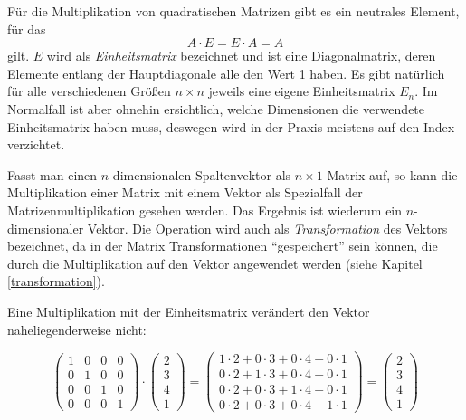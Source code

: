 Für die Multiplikation von quadratischen Matrizen gibt es ein neutrales Element, für das
\begin{equation}
 A \cdot E = E \cdot A = A
\end{equation}
gilt. $E$ wird als \emph{Einheitsmatrix} bezeichnet und ist eine Diagonalmatrix, deren Elemente entlang der Hauptdiagonale alle den Wert 1 haben. Es gibt natürlich für alle verschiedenen Größen $n \times n$ jeweils eine eigene Einheitsmatrix $E_n$. Im Normalfall ist aber ohnehin ersichtlich, welche Dimensionen die verwendete Einheitsmatrix haben muss, deswegen wird in der Praxis meistens auf den Index verzichtet.

Fasst man einen $n$-dimensionalen Spaltenvektor als $n \times 1$-Matrix auf, so kann die Multiplikation einer Matrix mit einem Vektor als Spezialfall der Matrizenmultiplikation gesehen werden. Das Ergebnis ist wiederum ein $n$-dimensionaler Vektor. Die Operation wird auch als \emph{Transformation} des Vektors bezeichnet, da in der Matrix Transformationen \enquote{gespeichert} sein können, die durch die Multiplikation auf den Vektor angewendet werden (siehe Kapitel \ref{transformation}).

Eine Multiplikation mit der Einheitsmatrix verändert den Vektor naheliegenderweise nicht:

\begin{equation}
 \begin{pmatrix}
  1 & 0 & 0 & 0 \\
  0 & 1 & 0 & 0 \\
  0 & 0 & 1 & 0 \\
  0 & 0 & 0 & 1
 \end{pmatrix}
 \cdot
 \begin{pmatrix}
  2 \\
  3 \\
  4 \\
  1
 \end{pmatrix}
 =
 \begin{pmatrix}
  1 \cdot 2 + 0 \cdot 3 + 0 \cdot 4 + 0 \cdot 1 \\
  0 \cdot 2 + 1 \cdot 3 + 0 \cdot 4 + 0 \cdot 1 \\
  0 \cdot 2 + 0 \cdot 3 + 1 \cdot 4 + 0 \cdot 1 \\
  0 \cdot 2 + 0 \cdot 3 + 0 \cdot 4 + 1 \cdot 1
 \end{pmatrix}
 =
 \begin{pmatrix}
  2 \\
  3 \\
  4 \\
  1
 \end{pmatrix}
\end{equation}

